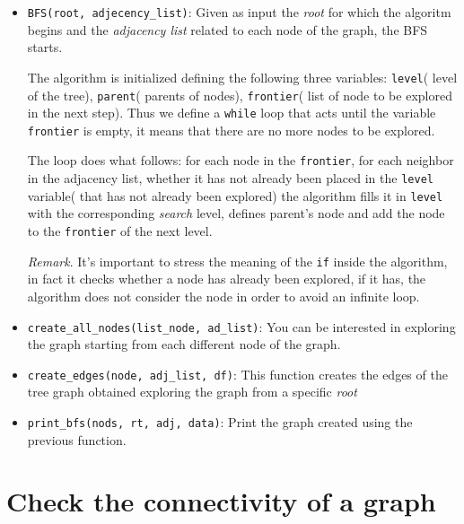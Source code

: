 \documentclass[10pt,a4paper]{article}
\begin{document}
\begin{itemize}
\item{\texttt{BFS(root, adjecency\_list)}: Given as input the \emph{root} for which the algoritm begins and the \emph{adjacency list} related to each node of the graph, the BFS starts. 

The algorithm is initialized defining the following three variables: \texttt{level}( level of the tree), \texttt{parent}( parents of nodes), \texttt{frontier}( list of node to be explored in the next step). Thus we define a \texttt{while} loop that acts until the variable \texttt{frontier} is empty, it means that there are no more nodes to be explored. 

The loop does what follows: for each node in the \texttt{frontier}, for each neighbor in the adjacency list, whether it has not already been placed in the \texttt{level} variable( that has not already been explored) the algorithm fills it in \texttt{level} with the corresponding \emph{search} level, defines parent's node and add the node to the \texttt{frontier} of the next level.

\emph{Remark}. It's important to stress the meaning of the \texttt{if} inside the algorithm, in fact it checks whether a node has already been explored, if it has, the algorithm does not consider the node in order to avoid an infinite loop.}
\item{\texttt{create\_all\_nodes(list\_node, ad\_list)}: You can be interested in exploring the graph starting from each different node of the graph.}
\item{\texttt{create\_edges(node, adj\_list, df)}: This function creates the edges of the tree graph obtained exploring the graph from a specific \emph{root}}
\item{\texttt{print\_bfs(nods, rt, adj, data)}: Print the graph created using the previous function.}
\end{itemize}

\section{Check the connectivity of a graph}
\end{document}
